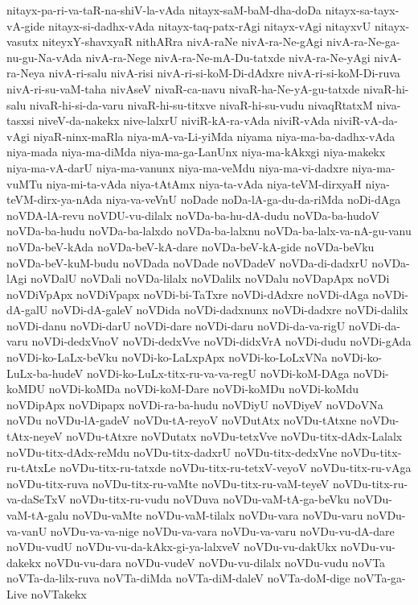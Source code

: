 {nitayx-pa-ri-va-taR-na-shiV-la-vAda
nitayx-saM-baM-dha-doDa
nitayx-sa-tayx-vA-gide
nitayx-si-dadhx-vAda
nitayx-taq-patx-rAgi
nitayx-vAgi
nitayxvU
nitayx-vasutx
niteyxY-shavxyaR
nithARra
nivA-raNe
nivA-ra-Ne-gAgi
nivA-ra-Ne-ga-nu-gu-Na-vAda
nivA-ra-Nege
nivA-ra-Ne-mA-Du-tatxde
nivA-ra-Ne-yAgi
nivA-ra-Neya
nivA-ri-salu
nivA-risi
nivA-ri-si-koM-Di-dAdxre
nivA-ri-si-koM-Di-ruva
nivA-ri-su-vaM-taha
nivAseV
nivaR-ca-navu
nivaR-ha-Ne-yA-gu-tatxde
nivaR-hi-salu
nivaR-hi-si-da-varu
nivaR-hi-su-titxve
nivaR-hi-su-vudu
nivaqRtatxM
niva-tasxsi
niveV-da-nakekx
nive-lalxrU
niviR-kA-ra-vAda
niviR-vAda
niviR-vA-da-vAgi
niyaR-ninx-maRla
niya-mA-va-Li-yiMda
niyama
niya-ma-ba-dadhx-vAda
niya-mada
niya-ma-diMda
niya-ma-ga-LanUnx
niya-ma-kAkxgi
niya-makekx
niya-ma-vA-darU
niya-ma-vanunx
niya-ma-veMdu
niya-ma-vi-dadxre
niya-ma-vuMTu
niya-mi-ta-vAda
niya-tAtAmx
niya-ta-vAda
niya-teVM-dirxyaH
niya-teVM-dirx-ya-nAda
niya-va-veVnU
noDade
noDa-lA-ga-du-da-riMda
noDi-dAga
noVDA-lA-revu
noVDU-vu-dilalx
noVDa-ba-hu-dA-dudu
noVDa-ba-hudoV
noVDa-ba-hudu
noVDa-ba-lalxdo
noVDa-ba-lalxnu
noVDa-ba-lalx-va-nA-gu-vanu
noVDa-beV-kAda
noVDa-beV-kA-dare
noVDa-beV-kA-gide
noVDa-beVku
noVDa-beV-kuM-budu
noVDada
noVDade
noVDadeV
noVDa-di-dadxrU
noVDa-lAgi
noVDalU
noVDali
noVDa-lilalx
noVDalilx
noVDalu
noVDapApx
noVDi
noVDiVpApx
noVDiVpapx
noVDi-bi-TaTxre
noVDi-dAdxre
noVDi-dAga
noVDi-dA-galU
noVDi-dA-galeV
noVDida
noVDi-dadxnunx
noVDi-dadxre
noVDi-dalilx
noVDi-danu
noVDi-darU
noVDi-dare
noVDi-daru
noVDi-da-va-rigU
noVDi-da-varu
noVDi-dedxVnoV
noVDi-dedxVve
noVDi-didxVrA
noVDi-dudu
noVDi-gAda
noVDi-ko-LaLx-beVku
noVDi-ko-LaLxpApx
noVDi-ko-LoLxVNa
noVDi-ko-LuLx-ba-hudeV
noVDi-ko-LuLx-titx-ru-va-va-regU
noVDi-koM-DAga
noVDi-koMDU
noVDi-koMDa
noVDi-koM-Dare
noVDi-koMDu
noVDi-koMdu
noVDipApx
noVDipapx
noVDi-ra-ba-hudu
noVDiyU
noVDiyeV
noVDoVNa
noVDu
noVDu-lA-gadeV
noVDu-tA-reyoV
noVDutAtx
noVDu-tAtxne
noVDu-tAtx-neyeV
noVDu-tAtxre
noVDutatx
noVDu-tetxVve
noVDu-titx-dAdx-Lalalx
noVDu-titx-dAdx-reMdu
noVDu-titx-dadxrU
noVDu-titx-dedxVne
noVDu-titx-ru-tAtxLe
noVDu-titx-ru-tatxde
noVDu-titx-ru-tetxV-veyoV
noVDu-titx-ru-vAga
noVDu-titx-ruva
noVDu-titx-ru-vaMte
noVDu-titx-ru-vaM-teyeV
noVDu-titx-ru-va-daSeTxV
noVDu-titx-ru-vudu
noVDuva
noVDu-vaM-tA-ga-beVku
noVDu-vaM-tA-galu
noVDu-vaMte
noVDu-vaM-tilalx
noVDu-vara
noVDu-varu
noVDu-va-vanU
noVDu-va-va-nige
noVDu-va-vara
noVDu-va-varu
noVDu-vu-dA-dare
noVDu-vudU
noVDu-vu-da-kAkx-gi-ya-lalxveV
noVDu-vu-dakUkx
noVDu-vu-dakekx
noVDu-vu-dara
noVDu-vudeV
noVDu-vu-dilalx
noVDu-vudu
noVTa
noVTa-da-lilx-ruva
noVTa-diMda
noVTa-diM-daleV
noVTa-doM-dige
noVTa-ga-Live
noVTakekx
}
